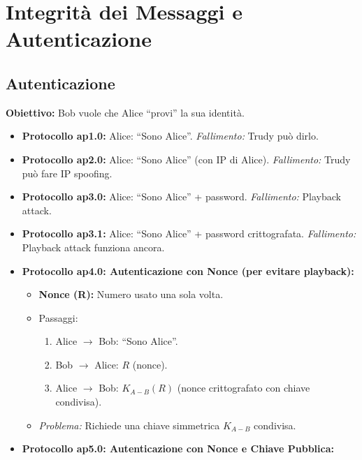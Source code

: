 \documentclass{article}
\begin{document}
\section{Integrità dei Messaggi e Autenticazione}
\label{sec:integrita_autenticazione}

\subsection{Autenticazione}
\textbf{Obiettivo:} Bob vuole che Alice \textquotedblleft provi\textquotedblright{} la sua identità.

\begin{itemize}
    \item \textbf{Protocollo ap1.0:} Alice: \textquotedblleft Sono Alice\textquotedblright{}. \textit{Fallimento:} Trudy può dirlo.
    \item \textbf{Protocollo ap2.0:} Alice: \textquotedblleft Sono Alice\textquotedblright{} (con IP di Alice). \textit{Fallimento:} Trudy può fare IP spoofing.
    \item \textbf{Protocollo ap3.0:} Alice: \textquotedblleft Sono Alice\textquotedblright{} + password. \textit{Fallimento:} Playback attack.
    \item \textbf{Protocollo ap3.1:} Alice: \textquotedblleft Sono Alice\textquotedblright{} + password crittografata. \textit{Fallimento:} Playback attack funziona ancora.
    \item \textbf{Protocollo ap4.0: Autenticazione con Nonce (per evitare playback):}
    \begin{itemize}
        \item \textbf{Nonce (R):} Numero usato una sola volta.
        \item Passaggi:
        \begin{enumerate}
            \item Alice $\rightarrow$ Bob: \textquotedblleft Sono Alice\textquotedblright{}.
            \item Bob $\rightarrow$ Alice: $R$ (nonce).
            \item Alice $\rightarrow$ Bob: $K_{A-B}(R)$ (nonce crittografato con chiave condivisa).
        \end{enumerate}
        \item \textit{Problema:} Richiede una chiave simmetrica $K_{A-B}$ condivisa.
    \end{itemize}
    \item \textbf{Protocollo ap5.0: Autenticazione con Nonce e Chiave Pubblica:}
    \begin{enumerate}

\end{enumerate}
\end{itemize}
\end{document}
